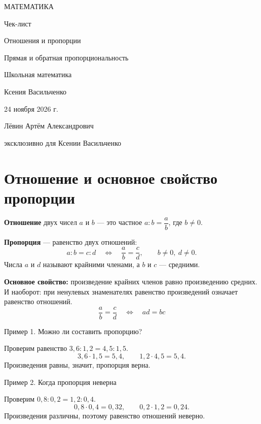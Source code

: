 \documentclass[a4paper,12pt]{article}
\newcommand{\ex}[1]{\par\medskip\textcolor{darkaccent}{#1}\par\smallskip}
\begin{document}
\begin{titlepage}
\centering
\vspace*{27mm}
{\Large\color{darkaccent} МАТЕМАТИКА\par}
\vspace{13mm}
{\LARGE Чек-лист\par}
\vspace{10mm}
{\LARGE\color{accent} Отношения и пропорции\par}
{\Large\color{accent} Прямая и обратная пропорциональность\par}
\vspace{14mm}
{\large Школьная математика\par}
\vfill
{\large Ксения Васильченко\par}
\vspace{8mm}
24 ноября 2026 г.\par
\vspace{15mm}
{\small Лёвин Артём Александрович\par эксклюзивно для Ксении Васильченко\par}
\vspace{15mm}
\end{titlepage}
\setcounter{page}{1}

\section{Отношение и основное свойство пропорции}
\textbf{Отношение} двух чисел $a$ и $b$ --- это частное $a:b=\dfrac{a}{b}$, где $b\ne0$.

\textbf{Пропорция} --- равенство двух отношений:
\[
 a:b=c:d\quad\Longleftrightarrow\quad \frac{a}{b}=\frac{c}{d},\qquad b\ne0,\ d\ne0.
\]
Числа $a$ и $d$ называют крайними членами, а $b$ и $c$ --- средними.
\begin{center}
\end{center}
\textbf{Основное свойство:} произведение крайних членов равно произведению средних. И наоборот: при ненулевых знаменателях равенство произведений означает равенство отношений.
\[
\boxed{\frac{a}{b}=\frac{c}{d}\quad\Longleftrightarrow\quad ad=bc}
\]
\ex{Пример 1. Можно ли составить пропорцию?}
Проверим равенство $3,6:1,2=4,5:1,5$.
\[
3,6\cdot1,5=5,4,\qquad 1,2\cdot4,5=5,4.
\]
Произведения равны, значит, пропорция верна.
\ex{Пример 2. Когда пропорция неверна}
Проверим $0,8:0,2=1,2:0,4$.
\[
0,8\cdot0,4=0,32,\qquad 0,2\cdot1,2=0,24.
\]
Произведения различны, поэтому равенство отношений неверно.
\end{document}
